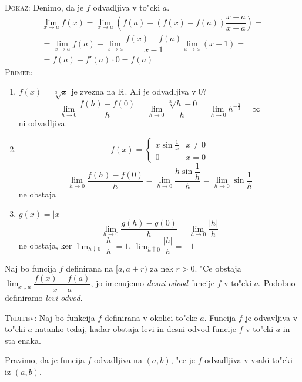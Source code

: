 \textsc{Dokaz:} Denimo, da je $f$ odvadljiva v to"cki $a$.
\begin{multline*}
\lim_{x \to a} f(x) = \lim_{x \to a} \left(f(a) + (f(x) - f(a)) \dfrac{x-a}{x-a}\right) = \\
= \lim_{x \to a} f(a) + \lim_{x \to a} \dfrac{f(x) - f(a)}{x - 1} \lim_{x \to a} (x - 1) = \\
= f(a) + f'(a) \cdot 0 = f(a)
\end{multline*}
\textsc{Primer:}
\begin{enumerate}[1)]
	\item $f(x) = \sqrt[3]{x}$ je zvezna na $\mathbb{R}$. Ali je odvadljiva v 0?
	\begin{equation*}
	\lim_{h \to 0} \dfrac{f(h) - f(0)}{h} = \lim_{h \to 0} \dfrac{\sqrt[3]{h} - 0}{h} = \lim_{h \to 0} h^{-\frac{2}{3}} = \infty
	\end{equation*}
	ni odvadljiva.
	
	\item \begin{equation*}
	f(x) = \begin{cases}
	x \sin \frac{1}{x} & x \neq 0 \\
	0 & x = 0
	\end{cases}
	\end{equation*}
	\begin{equation*}
	\lim_{h \to 0} \dfrac{f(h) - f(0)}{h} = \lim_{h \to 0} \dfrac{h \sin \dfrac{1}{h}}{h} = \lim_{h \to 0} \sin \dfrac{1}{h}
	\end{equation*}
	ne obstaja
	
	\item $g(x) = |x|$
	\begin{equation*}
	\lim_{h \to 0} \dfrac{g(h) -  g(0)}{h} = \lim_{h \to 0} \dfrac{|h|}{h}
	\end{equation*}
	ne obstaja, ker $\lim_{h \downarrow 0} \dfrac{|h|}{h} = 1$, $\lim_{h \uparrow 0} \dfrac{|h|}{h} = -1$
\end{enumerate}
%
 Naj bo funcija $f$ definirana na $[a, a + r)$ za nek $r > 0$. "Ce obstaja $\lim_{x \downarrow a} \dfrac{f(x) - f(a)}{x - a}$, jo imenujemo \emph{desni odvod} funcije $f$ v to"cki $a$. Podobno definiramo \emph{levi odvod}.

\textsc{Trditev:} Naj bo funkcija $f$ definirana v okolici to"cke $a$. Funcija $f$ je odvavljiva v to"cki $a$ natanko tedaj, kadar obstaja levi in desni odvod funcije $f$ v to"cki $a$ in sta enaka.

 Pravimo, da je funcija $f$ odvadljiva na $(a, b)$, "ce je $f$ odvadljiva v vsaki to"cki iz $(a, b)$.

